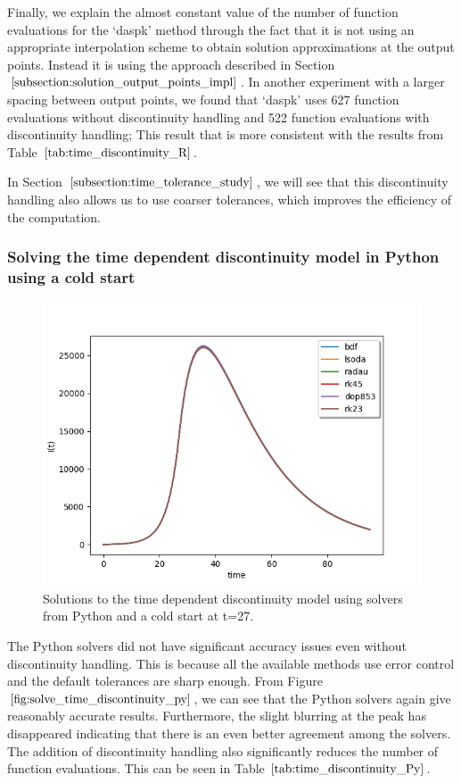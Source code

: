 Finally, we explain the almost constant value of the number of function evaluations for the `daspk' method through the fact that it is not using an appropriate interpolation scheme to obtain solution approximations at the output points. Instead it is using the approach described in Section $\ref{subsection:solution_output_points_impl}$. In another experiment with a larger spacing between output points, we found that `daspk' uses 627 function evaluations without discontinuity handling and 522 function evaluations with discontinuity handling; This result that is more consistent with the results from Table $\ref{tab:time_discontinuity_R}$.

In Section $\ref{subsection:time_tolerance_study}$, we will see that this discontinuity handling also allows us to use coarser tolerances, which improves the efficiency of the computation.

\subsubsection{Solving the time dependent discontinuity model in Python using a cold start} 
\begin{figure}[H]
\centering
\includegraphics[width=0.7\linewidth]{./figures/solve_time_discontinuity_py}
\caption{Solutions to the time dependent discontinuity model using solvers from Python and a cold start at t=27.}
\label{fig:solve_time_discontinuity_py}
\end{figure}
The Python solvers did not have significant accuracy issues even without discontinuity handling. This is because all the available methods use error control and the default tolerances are sharp enough. From Figure $\ref{fig:solve_time_discontinuity_py}$, we can see that the Python solvers again give reasonably accurate results. Furthermore, the slight blurring at the peak has disappeared indicating that there is an even better agreement among the solvers. The addition of discontinuity handling also significantly reduces the number of function evaluations. This can be seen in Table $\ref{tab:time_discontinuity_Py}$.

